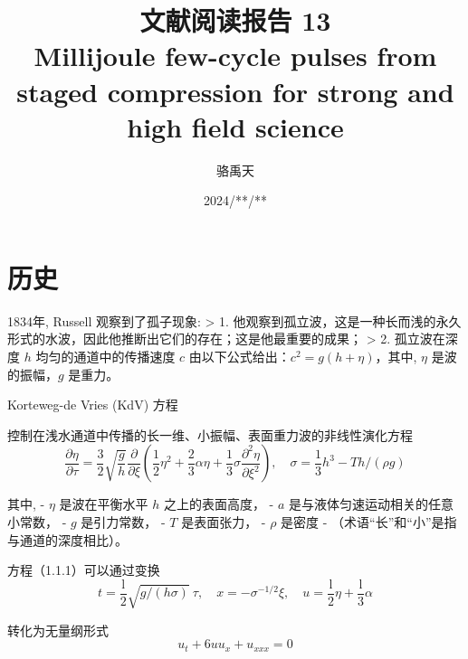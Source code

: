 \documentclass[14pt,a4paper,oneside]{article}
\title{\textbf{文献阅读报告 13\\Millijoule few-cycle pulses from staged compression for strong and high field science}\cite{stanfieldMillijouleFewcyclePulses2021}}                           %
\author{骆禹天}                                           %
\date{2024/**/**}                                        %
\begin{document}

\maketitle

\setcounter{page}{1}          %




\tableofcontents              %

\newpage
\setcounter{page}{1}          %







\section{历史}

1834年, Russell 观察到了孤子现象:
> 1. 他观察到孤立波，这是一种长而浅的永久形式的水波，因此他推断出它们的存在；这是他最重要的成果； 
> 2. 孤立波在深度 $h$ 均匀的通道中的传播速度 $c$ 由以下公式给出：$c^2 = g(h +\eta )$，其中, $\eta$ 是波的振幅，$g$ 是重力。


Korteweg-de Vries (KdV) 方程

控制在浅水通道中传播的长一维、小振幅、表面重力波的非线性演化方程
\begin{equation}
   \frac{\partial\eta}{\partial\tau}=\frac32\sqrt{\frac gh}\frac\partial{\partial\xi}\left(\frac12\eta^2+\frac23\alpha\eta+\frac13\sigma\frac{\partial^2\eta}{\partial\xi^2}\right),\quad\sigma=\frac13h^3-Th/(\rho g)
\end{equation}


其中,
- $\eta$ 是波在平衡水平 $h$ 之上的表面高度，
- $a$ 是与液体匀速运动相关的任意小常数，
- $g$ 是引力常数，
- $T$ 是表面张力，
- $\rho$ 是密度
- （术语“长”和“小”是指与通道的深度相比）。

方程（1.1.1）可以通过变换
\begin{equation}
    t=\frac{\mathrm{l}}2\sqrt{g/(h\sigma)}\:\tau,\quad x=-\sigma^{-1/2}\xi,\quad u=\frac{\mathrm{l}}2\eta+\frac{\mathrm{l}}3\alpha 
\end{equation}

转化为无量纲形式
\begin{equation}
    u_t+6uu_x+u_{xxx}=0
\end{equation}
\end{document}
